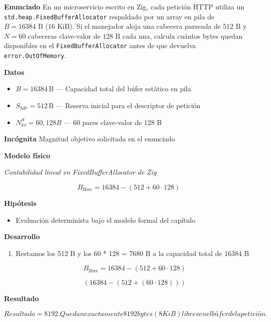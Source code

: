 \documentclass{book}
\begin{document}
\begin{tcolorbox}[title={Problema resuelto}, studiumworked, breakable]

\noindent\textbf{Enunciado}
En un microservicio escrito en Zig, cada petición HTTP utiliza un \texttt{std.heap.FixedBufferAllocator} respaldado por un array en pila de \(B = 16384\text{ B}\) (\(16\text{ KiB}\)). Si el manejador aloja una cabecera parseada de \(512\text{ B}\) y \(N = 60\) cabeceras clave-valor de \(128\text{ B}\) cada una, calcula cuántos bytes quedan disponibles en el \texttt{FixedBufferAllocator} antes de que devuelva \texttt{error.OutOfMemory}.

\noindent\textbf{Datos}
\begin{itemize}
\item $B = 16384\,\mathrm{B}$ — Capacidad total del búfer estático en pila
\item $S_{hdr} = 512\,\mathrm{B}$ — Reserva inicial para el descriptor de petición
\item $N^{S}_{kv} = 60, 128 B$ — 60 pares clave-valor de 128 B
\end{itemize}

\noindent\textbf{Incógnita}
Magnitud objetivo solicitada en el enunciado

\noindent\textbf{Modelo físico}

\noindent\textit{Contabilidad lineal en FixedBufferAllocator de Zig}

\[
B_{\text{libre}} = 16384 - (512 + 60 \cdot 128)
\]

\noindent\textbf{Hipótesis}
\begin{itemize}
\item Evaluación determinista bajo el modelo formal del capítulo
\end{itemize}

\noindent\textbf{Desarrollo}
\begin{enumerate}
\item
Restamos los 512 B y los 60 * 128 = 7680 B a la capacidad total de 16384 B

\[
B_{\text{libre}} = 16384 - (512 + 60 \cdot 128)
\]

\[
\left(16384-\left(512+\left(60\cdot 128\right)\right)\right)
\]
\end{enumerate}

\noindent\textbf{Resultado}

\[
Resultado = 8192. Quedan exactamente 8192 bytes (8 KiB) libres en el búfer de la petición.
\]


\end{tcolorbox}
\end{document}
